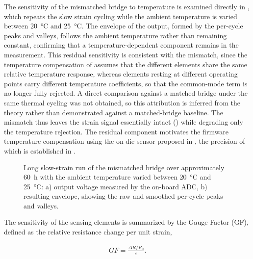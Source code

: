 The sensitivity of the mismatched bridge to temperature is examined directly in , which repeats the slow strain cycling while the ambient temperature is varied between \SI{20}{\celsius} and \SI{25}{\celsius}. The envelope of the output, formed by the per-cycle peaks and valleys, follows the ambient temperature rather than remaining constant, confirming that a temperature-dependent component remains in the measurement. 
This residual sensitivity is consistent with the mismatch, since the temperature compensation of  assumes that the different elements share the same relative temperature response, whereas elements resting at different operating points carry different temperature coefficients, so that the common-mode term is no longer fully rejected. A direct comparison against a matched bridge under the same thermal cycling was not obtained, so this attribution is inferred from the theory rather than demonstrated against a matched-bridge baseline. The mismatch thus leaves the strain signal essentially intact () while degrading only the temperature rejection. The residual component motivates the firmware temperature compensation using the on-die sensor proposed in , the precision of which is established in .

\begin{figure}
\centering

    \caption{Long slow-strain run of the mismatched bridge over approximately \SI{60}{\hour} with the ambient temperature varied between \SI{20}{\celsius} and \SI{25}{\celsius}: a) output voltage measured by the on-board ADC, b) resulting envelope, showing the raw and smoothed per-cycle peaks and valleys.}
    \label{fig:sidsteTest}
\end{figure}

\pagebreak
The sensitivity of the sensing elements is summarized by the Gauge Factor (GF), defined as the relative resistance change per unit strain,

\begin{align}\label{eq:gauge_factor}
    \mathit{GF} = \frac{\Delta R / R_0}{\varepsilon}.
\end{align}

